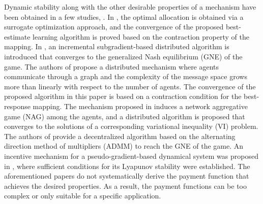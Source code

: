 \documentclass[twocolumn]{autart}
\begin{document}
\par
Dynamic stability along with the other desirable properties of a mechanism have been obtained in a few studies, \cite{farhadi2018surrogate, zhang2019efficient, sinha2019distributed, eslami2022incentive, zhong2022nash}. In \cite{farhadi2018surrogate}, the optimal allocation is obtained via a surrogate optimization approach, and the convergence of the proposed best-estimate learning algorithm is proved based on the contraction property of the mapping. In \cite{zhang2019efficient}, an incremental subgradient-based distributed algorithm is introduced that converges to the generalized Nash equilibrium (GNE) of the game. The authors of \cite{sinha2019distributed} propose a distributed mechanism where agents communicate through a graph and the complexity of the message space grows more than linearly with respect to the number of agents. The convergence of the proposed algorithm in this paper is based on a contraction condition for the best-response mapping. The mechanism proposed in \cite{eslami2022incentive} induces a network aggregative game (NAG) among the agents, and a distributed algorithm is proposed that converges to the solutions of a corresponding variational inequality (VI) problem. The authors of \cite{zhong2022nash} provide a decentralized algorithm based on the alternating direction method of multipliers (ADMM) to reach the GNE of the game. An incentive mechanism for a pseudo-gradient-based dynamical system was proposed in \cite{yan2025social}, where sufficient conditions for its Lyapunov stability were established. The aforementioned papers do not systematically derive the payment function that achieves the desired properties. As a result, the payment functions can be too complex or only suitable for a specific application.
\end{document}

